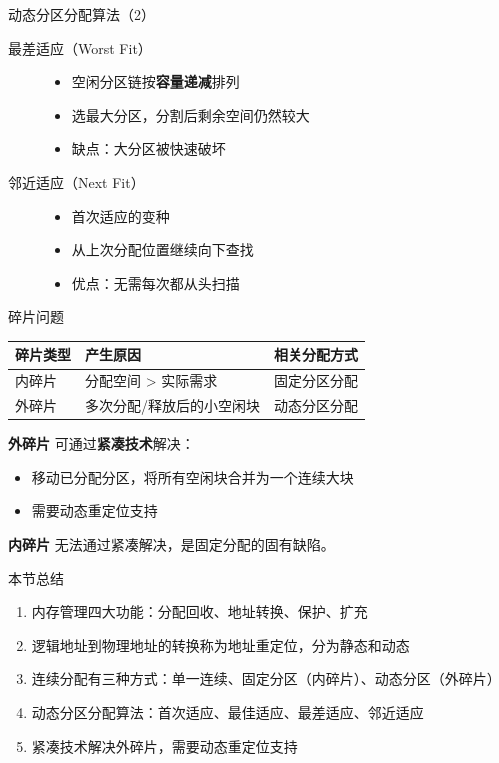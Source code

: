 \documentclass[10pt, aspectratio=169]{beamer}
\begin{document}
\begin{frame}{动态分区分配算法（2）}
    \begin{description}
        \item[最差适应（Worst Fit）]
            \begin{itemize}
                \item 空闲分区链按\textbf{容量递减}排列
                \item 选最大分区，分割后剩余空间仍然较大
                \item 缺点：大分区被快速破坏
            \end{itemize}
        \item[邻近适应（Next Fit）]
            \begin{itemize}
                \item 首次适应的变种
                \item 从上次分配位置继续向下查找
                \item 优点：无需每次都从头扫描
            \end{itemize}
    \end{description}
\end{frame}

\begin{frame}{碎片问题}
    \begin{center}
        \begin{tabular}{|l|l|l|}
            \hline
            \textbf{碎片类型} & \textbf{产生原因} & \textbf{相关分配方式} \\
            \hline
            内碎片 & 分配空间 > 实际需求 & 固定分区分配 \\
            外碎片 & 多次分配/释放后的小空闲块 & 动态分区分配 \\
            \hline
        \end{tabular}
    \end{center}
    \vspace{1em}
    \textbf{外碎片} 可通过\textbf{紧凑技术}解决：
    \begin{itemize}
        \item 移动已分配分区，将所有空闲块合并为一个连续大块
        \item 需要动态重定位支持
    \end{itemize}
    \textbf{内碎片} 无法通过紧凑解决，是固定分配的固有缺陷。
\end{frame}

\begin{frame}{本节总结}
    \begin{enumerate}
        \item 内存管理四大功能：分配回收、地址转换、保护、扩充
        \item 逻辑地址到物理地址的转换称为地址重定位，分为静态和动态
        \item 连续分配有三种方式：单一连续、固定分区（内碎片）、动态分区（外碎片）
        \item 动态分区分配算法：首次适应、最佳适应、最差适应、邻近适应
        \item 紧凑技术解决外碎片，需要动态重定位支持
    \end{enumerate}
\end{frame}
\end{document}
